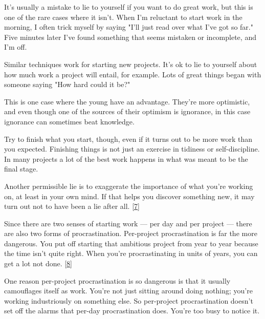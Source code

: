 It's usually a mistake to lie to yourself if
                  you want to do great work, but this is one of the rare cases
                  where it isn't. When I'm reluctant to start work in the
                  morning, I often trick myself by saying "I'll just read over
                  what I've got so far." Five minutes later I've found something
                  that seems mistaken or incomplete, and I'm off.

Similar
                  techniques work for starting new projects. It's ok to lie to
                  yourself about how much work a project will entail, for
                  example. Lots of great things began with someone saying "How
                  hard could it be?"

This is one case where the young
                  have an advantage. They're more optimistic, and even though
                  one of the sources of their optimism is ignorance, in this
                  case ignorance can sometimes beat knowledge.

Try to
                  finish what you start, though, even if it turns out to be more
                  work than you expected. Finishing things is not just an
                  exercise in tidiness or self-discipline. In many projects a
                  lot of the best work happens in what was meant to be the final
                  stage.

Another permissible lie is to exaggerate the
                  importance of what you're working on, at least in your own
                  mind. If that helps you discover something new, it may turn
                  out not to have been a lie after all.
                  [\href{\#f7n}{7}]






                  Since there are two senses of starting work --- per day
                  and per project --- there are also two forms of
                  procrastination. Per-project procrastination is far the more
                  dangerous. You put off starting that ambitious project from
                  year to year because the time isn't quite right. When you're
                  procrastinating in units of years, you can get a lot not done.
                  [\href{\#f8n}{8}]

One reason per-project procrastination is so
                  dangerous is that it usually camouflages itself as work.
                  You're not just sitting around doing nothing; you're working
                  industriously on something else. So per-project
                  procrastination doesn't set off the alarms that per-day
                  procrastination does. You're too busy to notice it.

